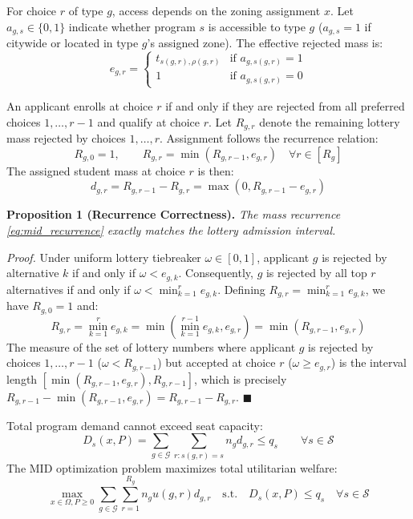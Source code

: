\documentclass{article}
\begin{document}
For choice $r$ of type $g$, access depends on the zoning assignment $x$. Let $a_{g, s} \in \{0, 1\}$ indicate whether program $s$ is accessible to type $g$ ($a_{g,s} = 1$ if citywide or located in type $g$'s assigned zone). The effective rejected mass is:
\begin{equation}
e_{g,r} = 
\begin{cases}
t_{s(g,r), \rho(g,r)} & \text{if } a_{g, s(g,r)} = 1 \\
1 & \text{if } a_{g, s(g,r)} = 0
\end{cases}
\end{equation}

An applicant enrolls at choice $r$ if and only if they are rejected from all preferred choices $1, \dots, r-1$ and qualify at choice $r$. Let $R_{g,r}$ denote the remaining lottery mass rejected by choices $1, \dots, r$. Assignment follows the recurrence relation:
\begin{equation}\label{eq:mid_recurrence}
R_{g,0} = 1, \qquad R_{g,r} = \min\left(R_{g,r-1}, e_{g,r}\right) \quad \forall r \in [R_g]
\end{equation}
The assigned student mass at choice $r$ is then:
\begin{equation}
d_{g,r} = R_{g,r-1} - R_{g,r} = \max\left(0, R_{g,r-1} - e_{g,r}\right)
\end{equation}

\noindent\textbf{Proposition 1 (Recurrence Correctness).} \textit{The mass recurrence \eqref{eq:mid_recurrence} exactly matches the lottery admission interval.}

\textit{Proof.} Under uniform lottery tiebreaker $\omega \in [0, 1]$, applicant $g$ is rejected by alternative $k$ if and only if $\omega < e_{g,k}$. Consequently, $g$ is rejected by all top $r$ alternatives if and only if $\omega < \min_{k=1}^r e_{g,k}$. Defining $R_{g,r} = \min_{k=1}^r e_{g,k}$, we have $R_{g,0} = 1$ and:
$$R_{g,r} = \min_{k=1}^r e_{g,k} = \min\left( \min_{k=1}^{r-1} e_{g,k}, e_{g,r} \right) = \min\left(R_{g,r-1}, e_{g,r}\right)$$
The measure of the set of lottery numbers where applicant $g$ is rejected by choices $1, \dots, r-1$ ($\omega < R_{g,r-1}$) but accepted at choice $r$ ($\omega \geq e_{g,r}$) is the interval length $[\min(R_{g,r-1}, e_{g,r}), R_{g,r-1}]$, which is precisely $R_{g,r-1} - \min(R_{g,r-1}, e_{g,r}) = R_{g,r-1} - R_{g,r}$. $\blacksquare$

Total program demand cannot exceed seat capacity:
\begin{equation}
D_s(x, P) = \sum_{g \in \mathcal{G}} \sum_{r : s(g,r) = s} n_g d_{g,r} \leq q_s \qquad \forall s \in \mathcal{S}
\end{equation}
The MID optimization problem maximizes total utilitarian welfare:
\begin{equation}
\max_{x \in \Omega, P \ge 0} \sum_{g \in \mathcal{G}} \sum_{r=1}^{R_g} n_g u(g,r) d_{g,r} \quad \text{s.t.} \quad D_s(x, P) \leq q_s \quad \forall s \in \mathcal{S}
\end{equation}
\end{document}
